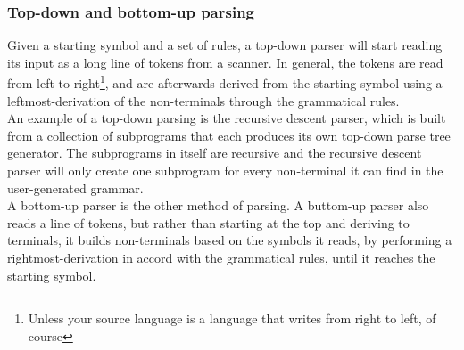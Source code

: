 \subsubsection*{Top-down and bottom-up parsing}
Given a starting symbol and a set of rules, a top-down parser will start reading its input as a long line of tokens from a scanner. In general, the tokens are read from left to right\footnote{Unless your source language is a language that writes from right to left, of course}, and are afterwards derived from the starting symbol using a leftmost-derivation of the non-terminals through the grammatical rules\cite{conceptsOfProgrammingLanguages}.\\

An example of a top-down parsing is the recursive descent parser, which is built from a collection of subprograms that each produces its own top-down parse tree generator. The subprograms in itself are recursive and the recursive descent parser will only create one subprogram for every non-terminal it can find in the user-generated grammar\cite{conceptsOfProgrammingLanguages}.\\

A bottom-up parser is the other method of parsing. A buttom-up parser also reads a line of tokens, but rather than starting at the top and deriving to terminals, it builds non-terminals based on the symbols it reads, by performing a rightmost-derivation in accord with the grammatical rules, until it reaches the starting symbol\cite{conceptsOfProgrammingLanguages}.\\

